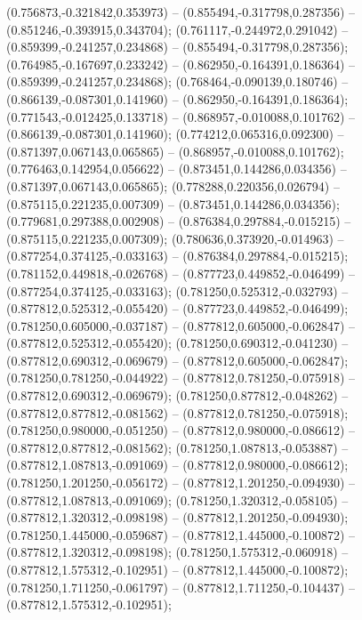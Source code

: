  (0.756873,-0.321842,0.353973) -- (0.855494,-0.317798,0.287356) -- (0.851246,-0.393915,0.343704);
 (0.761117,-0.244972,0.291042) -- (0.859399,-0.241257,0.234868) -- (0.855494,-0.317798,0.287356);
 (0.764985,-0.167697,0.233242) -- (0.862950,-0.164391,0.186364) -- (0.859399,-0.241257,0.234868);
 (0.768464,-0.090139,0.180746) -- (0.866139,-0.087301,0.141960) -- (0.862950,-0.164391,0.186364);
 (0.771543,-0.012425,0.133718) -- (0.868957,-0.010088,0.101762) -- (0.866139,-0.087301,0.141960);
 (0.774212,0.065316,0.092300) -- (0.871397,0.067143,0.065865) -- (0.868957,-0.010088,0.101762);
 (0.776463,0.142954,0.056622) -- (0.873451,0.144286,0.034356) -- (0.871397,0.067143,0.065865);
 (0.778288,0.220356,0.026794) -- (0.875115,0.221235,0.007309) -- (0.873451,0.144286,0.034356);
 (0.779681,0.297388,0.002908) -- (0.876384,0.297884,-0.015215) -- (0.875115,0.221235,0.007309);
 (0.780636,0.373920,-0.014963) -- (0.877254,0.374125,-0.033163) -- (0.876384,0.297884,-0.015215);
 (0.781152,0.449818,-0.026768) -- (0.877723,0.449852,-0.046499) -- (0.877254,0.374125,-0.033163);
 (0.781250,0.525312,-0.032793) -- (0.877812,0.525312,-0.055420) -- (0.877723,0.449852,-0.046499);
 (0.781250,0.605000,-0.037187) -- (0.877812,0.605000,-0.062847) -- (0.877812,0.525312,-0.055420);
 (0.781250,0.690312,-0.041230) -- (0.877812,0.690312,-0.069679) -- (0.877812,0.605000,-0.062847);
 (0.781250,0.781250,-0.044922) -- (0.877812,0.781250,-0.075918) -- (0.877812,0.690312,-0.069679);
 (0.781250,0.877812,-0.048262) -- (0.877812,0.877812,-0.081562) -- (0.877812,0.781250,-0.075918);
 (0.781250,0.980000,-0.051250) -- (0.877812,0.980000,-0.086612) -- (0.877812,0.877812,-0.081562);
 (0.781250,1.087813,-0.053887) -- (0.877812,1.087813,-0.091069) -- (0.877812,0.980000,-0.086612);
 (0.781250,1.201250,-0.056172) -- (0.877812,1.201250,-0.094930) -- (0.877812,1.087813,-0.091069);
 (0.781250,1.320312,-0.058105) -- (0.877812,1.320312,-0.098198) -- (0.877812,1.201250,-0.094930);
 (0.781250,1.445000,-0.059687) -- (0.877812,1.445000,-0.100872) -- (0.877812,1.320312,-0.098198);
 (0.781250,1.575312,-0.060918) -- (0.877812,1.575312,-0.102951) -- (0.877812,1.445000,-0.100872);
 (0.781250,1.711250,-0.061797) -- (0.877812,1.711250,-0.104437) -- (0.877812,1.575312,-0.102951);

